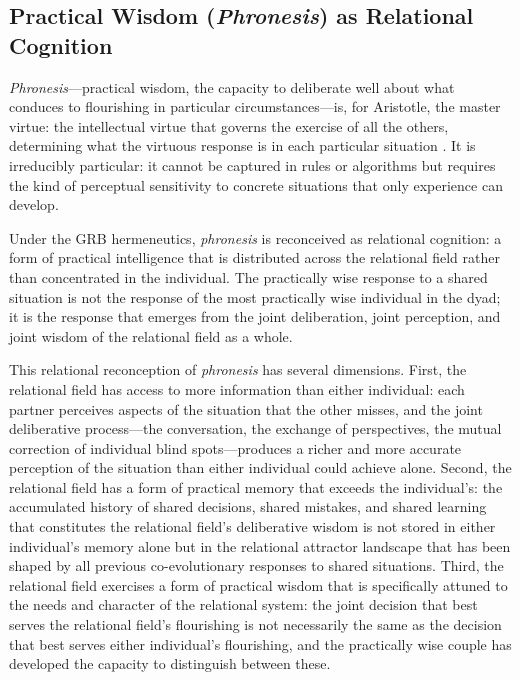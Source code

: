 \subsection{Practical Wisdom (\emph{Phronesis}) as Relational Cognition}
\label{p14:subsec:phronesis}

\noindent
\emph{Phronesis}---practical wisdom, the capacity to deliberate well about what conduces to flourishing in particular circumstances---is, for Aristotle, the master virtue: the intellectual virtue that governs the exercise of all the others, determining what the virtuous response is in each particular situation \parencite{aristotle2000}. It is irreducibly particular: it cannot be captured in rules or algorithms but requires the kind of perceptual sensitivity to concrete situations that only experience can develop.

Under the GRB hermeneutics, \emph{phronesis} is reconceived as relational cognition: a form of practical intelligence that is distributed across the relational field rather than concentrated in the individual. The practically wise response to a shared situation is not the response of the most practically wise individual in the dyad; it is the response that emerges from the joint deliberation, joint perception, and joint wisdom of the relational field as a whole.

This relational reconception of \emph{phronesis} has several dimensions. First, the relational field has access to more information than either individual: each partner perceives aspects of the situation that the other misses, and the joint deliberative process---the conversation, the exchange of perspectives, the mutual correction of individual blind spots---produces a richer and more accurate perception of the situation than either individual could achieve alone. Second, the relational field has a form of practical memory that exceeds the individual's: the accumulated history of shared decisions, shared mistakes, and shared learning that constitutes the relational field's deliberative wisdom is not stored in either individual's memory alone but in the relational attractor landscape that has been shaped by all previous co-evolutionary responses to shared situations. Third, the relational field exercises a form of practical wisdom that is specifically attuned to the needs and character of the relational system: the joint decision that best serves the relational field's flourishing is not necessarily the same as the decision that best serves either individual's flourishing, and the practically wise couple has developed the capacity to distinguish between these.

